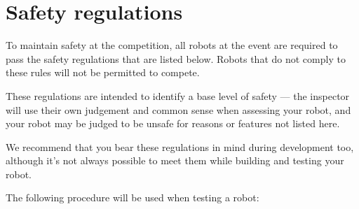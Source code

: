 \section {Safety regulations}
\label{sec:safety-regs}

To maintain safety at the competition, all robots at the event are required to
pass the safety regulations that are listed below. Robots that do not comply
to these rules will not be permitted to compete.

These regulations are intended to identify a base level of safety --- the
inspector will use their own judgement and common sense when assessing
your robot, and your robot may be judged to be unsafe for reasons or features
not listed here.

We recommend that you bear these regulations in mind during development too,
although it's not always possible to meet them while building and testing
your robot.

The following procedure will be used when testing a robot:

